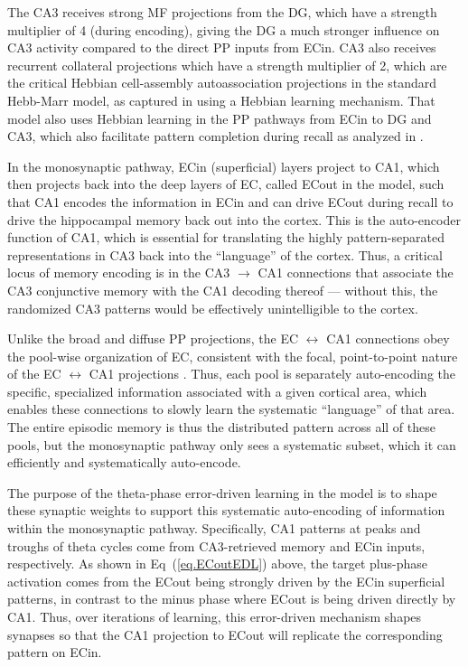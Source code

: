 \documentclass[11pt,twoside]{article}
\newif\myifpdf
\begin{document}
The CA3 receives strong MF projections from the DG, which have a strength multiplier of 4 (during encoding), giving the DG a much stronger influence on CA3 activity compared to the direct PP inputs from ECin.  CA3 also receives recurrent collateral projections which have a strength multiplier of 2, which are the critical Hebbian cell-assembly autoassociation projections in the standard Hebb-Marr model, as captured in \cite{KetzMorkondaOReilly13} using a Hebbian learning mechanism.  That model also uses Hebbian learning in the PP pathways from ECin to DG and CA3, which also facilitate pattern completion during recall as analyzed in \citet{OReillyMcClelland94}.

In the monosynaptic pathway, ECin (superficial) layers project to CA1, which then projects back into the deep layers of EC, called ECout in the model, such that CA1 encodes the information in ECin and can drive ECout during recall to drive the hippocampal memory back out into the cortex.  This is the auto-encoder function of CA1, which is essential for translating the highly pattern-separated representations in CA3 back into the ``language'' of the cortex.  Thus, a critical locus of memory encoding is in the CA3 $\rightarrow$ CA1 connections that associate the CA3 conjunctive memory with the CA1 decoding thereof --- without this, the randomized CA3 patterns would be effectively unintelligible to the cortex.

Unlike the broad and diffuse PP projections, the EC $\leftrightarrow$ CA1 connections obey the pool-wise organization of EC, consistent with the focal, point-to-point nature of the EC $\leftrightarrow$ CA1 projections \citep{WitterDoanJacobsenEtAl17}.  Thus, each pool is separately auto-encoding the specific, specialized information associated with a given cortical area, which enables these connections to slowly learn the systematic ``language'' of that area.  The entire episodic memory is thus the distributed pattern across all of these pools, but the monosynaptic pathway only sees a systematic subset, which it can efficiently and systematically auto-encode.

The purpose of the theta-phase error-driven learning in the \citet{KetzMorkondaOReilly13} model is to shape these synaptic weights to support this systematic auto-encoding of information within the monosynaptic pathway.  Specifically, CA1 patterns at peaks and troughs of theta cycles come from CA3-retrieved memory and ECin inputs, respectively.  As shown in Eq~(\ref{eq.ECoutEDL}) above, the target plus-phase activation comes from the ECout being strongly driven by the ECin superficial patterns, in contrast to the minus phase where ECout is being driven directly by CA1.  Thus, over iterations of learning, this error-driven mechanism shapes synapses so that the CA1 projection to ECout will replicate the corresponding pattern on ECin.
\end{document}

